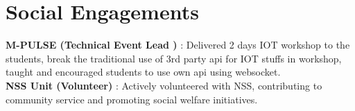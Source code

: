 \section{Social Engagements}
    \begin{itemize}[leftmargin=0.15in, label={}]
	\small{\item{
		\textbf{M-PULSE (Technical Event Lead )}{ : Delivered 2 days IOT workshop to the students, break the traditional use of 3rd party api for IOT stuffs in workshop, taught and encouraged students to use own api using websocket. } \\
		\textbf{NSS Unit (Volunteer) }{: Actively volunteered with NSS, contributing to community service and promoting social welfare initiatives. } \\
  		
	}}
    \end{itemize}


